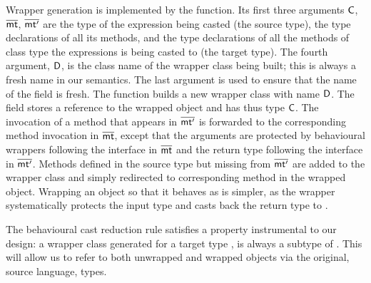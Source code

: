 \documentclass[acmlarge, anonymous, authordraft]{acmart}
\newcommand{\FZ}[1]{\textbf{FZ: #1}}
\begin{document}
Wrapper generation is implemented by the  function.  Its first three arguments \({\sf{C}}\), \(\overline{{\sf{mt}}}\), \(\overline{{\sf{mt'}}}\) are the type of the expression being casted (the source type), the type declarations of all its methods, and the type declarations of all the methods of class type the expressions is being casted to (the target type).  The fourth argument, \({\sf{D}}\), is the class name  of the wrapper class being built; this is always a fresh name in our semantics. The last argument is used to ensure that the name of the \that field is  fresh.   The function  builds a new wrapper class with name \({\sf{D}}\).  The field  stores a reference to the wrapped object and has thus type \({\sf{C}}\).  The invocation of a method that appears in \(\overline{{\sf{mt'}}}\) is forwarded to the corresponding method invocation in \(\overline{{\sf{mt}}}\), except that the arguments are protected by behavioural wrappers following the interface in \(\overline{{\sf{mt}}}\) and the return type following the interface in \(\overline{{\sf{mt'}}}\).    Methods defined in the source type but missing from \(\overline{{\sf{mt'}}}\) are added to the wrapper class and simply redirected to corresponding method in the wrapped object.
Wrapping an object so that it behaves as \any is simpler, as the wrapper systematically protects the input type and casts back the return type to \any.


%

%
%
% 

% 



The behavioural cast reduction rule satisfies a property instrumental to our design: a wrapper class generated for a target type \D,  is always a subtype of \D.  This will allow us to refer to both
unwrapped and wrapped objects via the original, source language,
types.   
%
%
%
\end{document}
